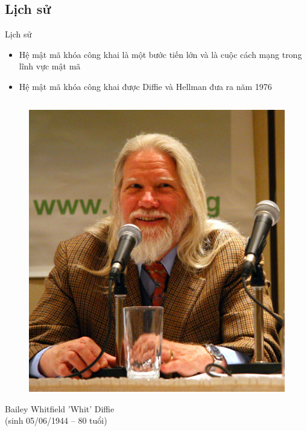 \documentclass{beamer}
\numberwithin{equation}{section}
\begin{document}
\subsection{Lịch sử}
\begin{frame}{Lịch sử}

\begin{itemize}
\item Hệ mật mã khóa công khai là một bước tiến lớn và là cuộc cách mạng trong lĩnh vực mật mã
\item Hệ mật mã khóa công khai được Diffie và Hellman đưa ra năm 1976
\end{itemize}

\begin{columns}

\begin{column}{0.4\textwidth}
\begin{figure}[H]
\centering
\includegraphics[scale = 0.4]{pictures/Bailey_Whitfield_Diffie.png}
\end{figure}
Bailey Whitfield 'Whit' Diffie\\ (sinh 05/06/1944 – 80 tuổi)
\end{column}


\end{columns}
\end{frame}
\end{document}
